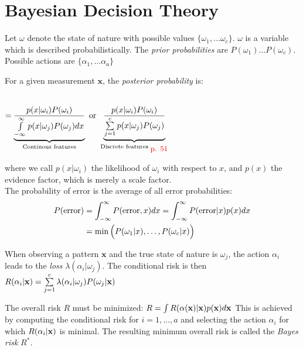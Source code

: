 \section{Bayesian Decision Theory}
\begin{minipage}{9.5cm}
  Let $\omega$ denote the state of nature with possible values $\{\omega_1, \ldots \omega_c\}$.
  $\omega$ is a variable which is described probabilistically.
  The \emph{prior probabilities} are $P(\omega_1) \ldots P(\omega_c)$.
  Possible actions are $\{\alpha_1, \ldots \alpha_a\}$

  For a given measurement $\mathbf{x}$, the \emph{posterior probability} is:
  \begin{center}
     \\
    $= \underbrace{\frac{p(x|\omega_i) P(\omega_i)}{\int\limits_{-\infty}^{\infty}p(x|\omega_j) P(\omega_j) dx}}_{\text{Continous features}}
     \text{ or } 
     \underbrace{\frac{p(x|\omega_i) P(\omega_i)}{\sum\limits_{j=1}^{c}p(x|\omega_j) P(\omega_j)}}_{\text{Discrete features $_{\textcolor{red}{\mbox{\small{p. 51}}}}$}}$
  \end{center}
  
where we call $p(x|\omega_i)$ the likelihood of $\omega_i$ with respect to $x$,
and $p(x)$ the evidence factor, which is merely a scale factor. \\

The probability of error is the average of all error probabilities:
  \begin{align*}
      P(\mathrm{error}) &= \int_{-\infty}^{\infty} P(\mathrm{error}, x) dx = \int_{-\infty}^{\infty} P(\mathrm{error}|x) p(x) dx \\
       &= \min\Big(P(\omega_1|x), \ldots, P(\omega_c|x)\Big)
  \end{align*}


When observing a pattern $\mathbf{x}$ and the true state of nature is $\omega_j$,
the action $\alpha_i$ leads to the \emph{loss} $\lambda(\alpha_i|\omega_j)$.
The conditional risk is then 
$R(\alpha_i|\mathbf{x}) = \sum\limits_{j=1}^c \lambda(\alpha_i|\omega_j)P(\omega_j|\mathbf{x})$

The overall risk $R$ must be minimized:
$R = \int R(\alpha(\mathbf{x})|\mathbf{x})p(\mathbf{x}) d\mathbf{x}$
This is achieved by computing the conditional risk for $i=1,\ldots,a$ 
and selecting the action $\alpha_i$ for which $R(\alpha_i|\mathbf{x})$ is minimal.
The resulting minimum overall risk is called the \emph{Bayes risk} $R^*$.
  
\end{minipage} \vspace{1cm}
